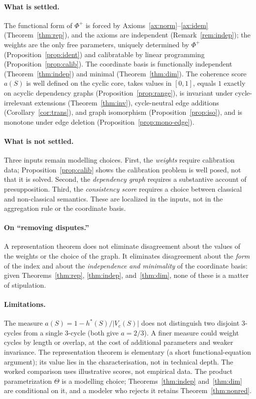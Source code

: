 \documentclass[11pt]{article}
\theoremstyle{definition}
\theoremstyle{remark}
\newcommand{\Ph}{\Phi^{+}}
\newcommand{\Th}{\Theta}
\begin{document}
\paragraph{What is settled.} The functional form of $\Ph$ is forced by Axioms~\ref{ax:norm}--\ref{ax:idem} (Theorem~\ref{thm:rep}), and the axioms are independent (Remark~\ref{rem:indep}); the weights are the only free parameters, uniquely determined by $\Ph$ (Proposition~\ref{prop:ident}) and calibratable by linear programming (Proposition~\ref{prop:calib}). The coordinate basis is functionally independent (Theorem~\ref{thm:indep}) and minimal (Theorem~\ref{thm:dim}). The coherence score $a(S)$ is well defined on the cyclic core, takes values in $[0,1]$, equals $1$ exactly on acyclic dependency graphs (Proposition~\ref{prop:range}), is invariant under cycle-irrelevant extensions (Theorem~\ref{thm:inv}), cycle-neutral edge additions (Corollary~\ref{cor:trans}), and graph isomorphism (Proposition~\ref{prop:iso}), and is monotone under edge deletion (Proposition~\ref{prop:mono-edge}).

\paragraph{What is not settled.} Three inputs remain modelling choices. First, the \emph{weights} require calibration data; Proposition~\ref{prop:calib} shows the calibration problem is well posed, not that it is solved. Second, the \emph{dependency graph} requires a substantive account of presupposition. Third, the \emph{consistency score} requires a choice between classical and non-classical semantics. These are localized in the inputs, not in the aggregation rule or the coordinate basis.

\paragraph{On ``removing disputes.''} A representation theorem does not eliminate disagreement about the values of the weights or the choice of the graph. It eliminates disagreement about the \emph{form} of the index and about the \emph{independence and minimality} of the coordinate basis: given Theorems~\ref{thm:rep}, \ref{thm:indep}, and~\ref{thm:dim}, none of these is a matter of stipulation.

\paragraph{Limitations.} The measure $a(S)=1-h^*(S)/|V_c(S)|$ does not distinguish two disjoint $3$-cycles from a single $3$-cycle (both give $a=2/3$). A finer measure could weight cycles by length or overlap, at the cost of additional parameters and weaker invariance. The representation theorem is elementary (a short functional-equation argument); its value lies in the characterisation, not in technical depth. The worked comparison uses illustrative scores, not empirical data. The product parametrization $\Th$ is a modelling choice; Theorems~\ref{thm:indep} and~\ref{thm:dim} are conditional on it, and a modeler who rejects it retains Theorem~\ref{thm:nonred}.
\end{document}
